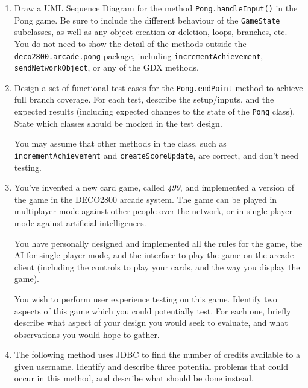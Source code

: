 \documentclass[a4paper,11pt]{article}
\begin{document}
\begin{enumerate}
\item
Draw a UML Sequence Diagram for the method
{\tt Pong.handleInput()} in the Pong game.
Be sure to include the different behaviour of the {\tt GameState} subclasses,
as well as any object creation or deletion, loops, branches, etc.
You do not need to show the detail of the methods outside the
{\tt deco2800.arcade.pong} package, including
{\tt incrementAchievement}, {\tt sendNetworkObject}, or any of the GDX methods.

\item
Design a set of functional test cases for the {\tt Pong.endPoint} method to
achieve full branch coverage. For each test, describe the setup/inputs, and
the expected results (including expected changes to the state of the {\tt Pong}
class). State which classes should be mocked in the test design.

You may assume that other methods in the class, such as
{\tt incrementAchievement} and {\tt createScoreUpdate}, are correct, and don't
need testing.

\item
You've invented a new card game, called
{\em 499}, and implemented a version of the game in the DECO2800
arcade system. The game can be played in multiplayer mode against other people
over the network, or in single-player mode against artificial intelligences.

You have personally designed and implemented all the rules for the game, the
AI for single-player mode, and the interface to play the game on the
arcade client (including the controls to play your cards, and the way you
display the game).

You wish to perform user experience testing on this game. Identify two aspects
of this game which you could potentially test. For each one, briefly describe
what aspect of your design you would seek to evaluate, and what observations
you would hope to gather.

\item
The following method uses JDBC to find the number of credits available to a
given username. Identify and describe three potential problems that could occur
in this method, and describe what should be done instead.



\newpage


\end{enumerate}
\end{document}
